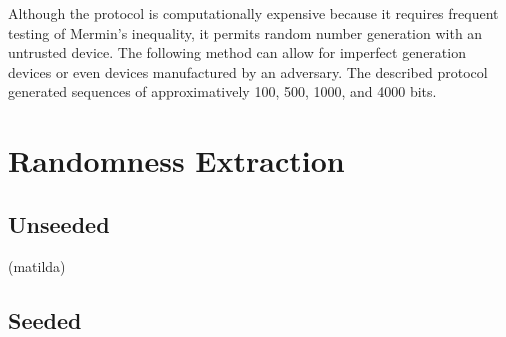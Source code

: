 \documentclass[lettersize,journal]{IEEEtran}
\begin{document}
Although the protocol is computationally expensive because it requires frequent testing of Mermin's inequality, it permits random number generation with an untrusted device. The following method can allow for imperfect generation devices or even devices manufactured by an adversary. 
The described protocol generated sequences of approximatively 100, 500, 1000, and 4000 bits. 

\section{Randomness Extraction}
\subsection{Unseeded}
(matilda)
\subsection{Seeded}

\pagebreak



\end{document}
